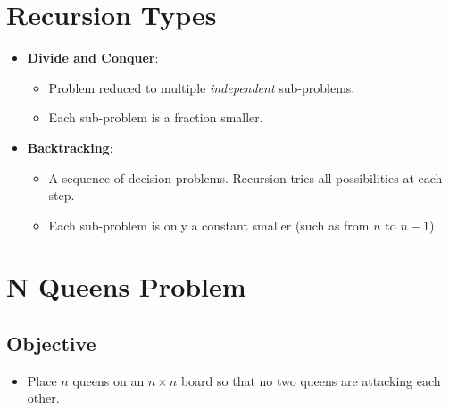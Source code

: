 \documentclass[12pt]{article}
\date{March 9, 2021}
\begin{document}
\maketitle

\section{Recursion Types}

\begin{itemize}
    \item \textbf{Divide and Conquer}:
    \begin{itemize}
        \item Problem reduced to multiple \textit{independent} sub-problems.
        \item Each sub-problem is a fraction smaller.
    \end{itemize}
    \item \textbf{Backtracking}:
    \begin{itemize}
        \item A sequence of decision problems. Recursion tries all possibilities at each step.
        \item Each sub-problem is only a constant smaller (such as from $n$ to $n - 1$)
    \end{itemize}
\end{itemize}

\section{N Queens Problem}

\subsection{Objective}
\begin{itemize}
    \item Place $n$ queens on an $n \times n$ board so that no two queens are attacking each other.
\end{itemize}
\end{document}
